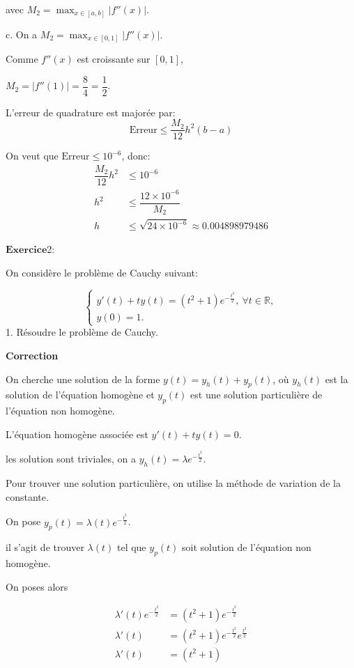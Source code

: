 \documentclass{article}
\newcommand{\correction}[0]{
    \vspace{1mm}
    \textbf{Correction}
    \hrulefill
}
\begin{document}
avec $M_2 = \max_{x \in [a,b]} |f''(x)|.$

c. On a $M_2 = \max_{x \in [0,1]} |f''(x)|$. 

Comme $f''(x)$ est croissante sur $[0,1]$, 

$M_2 = |f''(1)| = \dfrac{8}{4} = \dfrac{1}{2}$.

L'erreur de quadrature est majorée par:
\begin{equation*}
    \text{Erreur} \leq \dfrac{M_2}{12}h^2(b - a)
\end{equation*}

On veut que $\text{Erreur} \leq 10^{-6}$, donc:
\begin{align*}
    \dfrac{M_2}{12}h^2 &\leq 10^{-6} \\
    h^2 &\leq \dfrac{12 \times 10^{-6}}{M_2} \\
    h &\leq \sqrt{24 \times 10^{-6}} \approx 0.004898979486
\end{align*}

\hrulefill

$\mathbf{Exercice}$2:

On considère le problème de Cauchy suivant:

$$
\begin{cases}y'(t)+ty(t)=\left(t^2+1\right)e^{-\frac{t^2}{2}},\:\forall t\in\mathbb{R},\\y(0)=1.\end{cases}
$$
1. Résoudre le problème de Cauchy.

\correction

On cherche une solution de la forme $y(t) = y_h(t) + y_p(t)$, 
où $y_h(t)$ est la solution de l'équation homogène 
et $y_p(t)$ est une solution particulière de l'équation non homogène.

L'équation homogène associée est $y'(t) + ty(t) = 0$.

les solution sont triviales, on a $y_h(t) = \lambda e^{-\frac{t^2}{2}}$.

Pour trouver une solution particulière, on utilise la méthode de variation de la constante.

On pose $y_p(t) = \lambda(t) e^{-\frac{t^2}{2}}$.

il s'agit de trouver $\lambda(t)$ tel que $y_p(t)$ soit solution de l'équation non homogène.

On poses alors

\begin{align*}
    \lambda'(t) e^{-\frac{t^2}{2}} &= \left(t^2 + 1\right)e^{-\frac{t^2}{2}} \\
    \lambda'(t) &= \left(t^2 + 1\right)e^{-\frac{t^2}{2}} e^{\frac{t^2}{2}} \\
    \lambda'(t) &= \left(t^2 + 1\right)
\end{align*}
\end{document}
